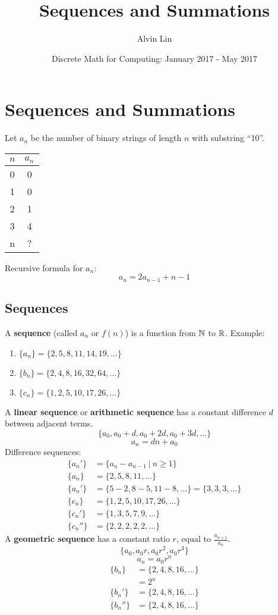 \documentclass[letterpaper, 12pt]{math}
\title{Sequences and Summations}
\author{Alvin Lin}
\date{Discrete Math for Computing: January 2017 - May 2017}
\begin{document}
\maketitle

\section*{Sequences and Summations}
Let \( a_{n} \) be the number of binary strings of length \( n \) with substring
``10''.
\begin{center}
  \begin{tabular}{|c|c|}
    \hline
    \( n \) & \( a_{n} \) \\
    \hline
    0 & 0 \\
    \hline
    1 & 0 \\
    \hline
    2 & 1 \\
    \hline
    3 & 4 \\
    \hline
    n & ? \\
    \hline
  \end{tabular}
\end{center}
Recursive formula for \( a_{n} \):
\[ a_{n} = 2a_{n-1}+n-1 \]

\subsection*{Sequences}
A \textbf{sequence} (called \( a_{n} \) or \( f(n) \)) is a function from
\( \mathbb{N} \) to \( \mathbb{R} \). Example:
\begin{enumerate}
  \item \( \{a_{n}\} = \{2,5,8,11,14,19,\dots\} \)
  \item \( \{b_{n}\} = \{2,4,8,16,32,64,\dots\} \)
  \item \( \{c_{n}\} = \{1,2,5,10,17,26,\dots\} \)
\end{enumerate}
A \textbf{linear sequence} or \textbf{arithmetic sequence} has a constant
difference \( d \) between adjacent terms.
\[ \{a_{0},a_{0}+d,a_{0}+2d,a_{0}+3d,\dots\} \]
\[ a_{n} = dn+a_{0} \]
Difference sequences:
\begin{align*}
  \{a_{n}'\} &= \{a_{n}-a_{n-1}\ |\ n \geq 1\} \\
  \{a_{n}\} &= \{2,5,8,11,\dots\} \\
  \{a_{n}'\} &= \{5-2,8-5,11-8,\dots\} = \{3,3,3,\dots\} \\
  \{c_{n}\} &= \{1,2,5,10,17,26,\dots\} \\
  \{c_{n}'\} &= \{1,3,5,7,9,\dots\} \\
  \{c_{n}''\} &= \{2,2,2,2,2,\dots\}
\end{align*}
A \textbf{geometric sequence} has a constant ratio \( r \), equal to
\( \frac{a_{n+1}}{a_{n}} \).
\[ \{a_{0},a_{0}r,a_{0}r^{2},a_{0}r^{3}\} \]
\[ a_{n} = a_{0}r^{n} \]
\begin{align*}
  \{b_{n}\} &= \{2,4,8,16,\dots\} \\
  &= 2^{n} \\
  \{b_{n}'\} &= \{2,4,8,16,\dots\} \\
  \{b_{n}''\} &= \{2,4,8,16,\dots\}
\end{align*}
\end{document}
